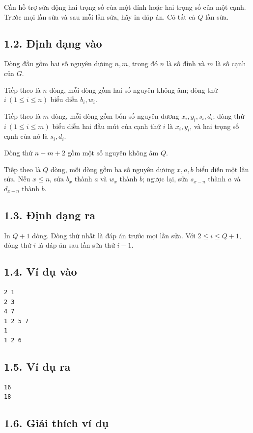 \documentclass[11pt]{article}
\begin{document}
Cần hỗ trợ sửa động hai trọng số của một đỉnh hoặc hai trọng số của một cạnh.
Trước mọi lần sửa và sau mỗi lần sửa, hãy in đáp án. Có tất cả \(Q\) lần sửa.

\subsection*{1.2. Định dạng vào}

Dòng đầu gồm hai số nguyên dương \(n,m\), trong đó \(n\) là số đỉnh và \(m\)
là số cạnh của \(G\).

Tiếp theo là \(n\) dòng, mỗi dòng gồm hai số nguyên không âm; dòng thứ
\(i\ (1\le i\le n)\) biểu diễn \(b_i,w_i\).

Tiếp theo là \(m\) dòng, mỗi dòng gồm bốn số nguyên dương \(x_i,y_i,s_i,d_i\);
dòng thứ \(i\ (1\le i\le m)\) biểu diễn hai đầu mút của cạnh thứ \(i\) là
\(x_i,y_i\), và hai trọng số cạnh của nó là \(s_i,d_i\).

Dòng thứ \(n+m+2\) gồm một số nguyên không âm \(Q\).

Tiếp theo là \(Q\) dòng, mỗi dòng gồm ba số nguyên dương \(x,a,b\) biểu diễn
một lần sửa. Nếu \(x\le n\), sửa \(b_x\) thành \(a\) và \(w_x\) thành \(b\);
ngược lại, sửa \(s_{x-n}\) thành \(a\) và \(d_{x-n}\) thành \(b\).

\subsection*{1.3. Định dạng ra}

In \(Q+1\) dòng. Dòng thứ nhất là đáp án trước mọi lần sửa. Với
\(2\le i\le Q+1\), dòng thứ \(i\) là đáp án sau lần sửa thứ \(i-1\).

\subsection*{1.4. Ví dụ vào}

\begin{verbatim}
2 1
2 3
4 7
1 2 5 7
1
1 2 6
\end{verbatim}

\subsection*{1.5. Ví dụ ra}

\begin{verbatim}
16
18
\end{verbatim}

\subsection*{1.6. Giải thích ví dụ}
\end{document}
